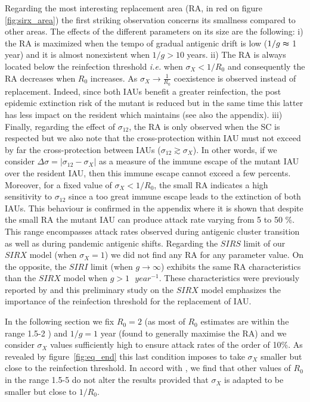 Regarding the most interesting replacement area (RA, in red on figure
\ref{fig:sirx_area}) the first striking observation concerns its
smallness compared to other areas. The effects of the different
parameters on its size are the following: i) the RA is maximized when
the tempo of gradual antigenic drift is low ($1/g\thickapprox$ 1 year)
and it is almost nonexistent when $1/g>10$ years. ii) The RA is always
located below the reinfection threshold \textit{i.e.} when
$\sigma_{X}<1/R_{0}$ and consequently the RA decreases when $R_{0}$
increases. As $\sigma_{X} \to \frac{1}{R_0}$ coexistence is observed
instead of replacement. Indeed, since both IAUs benefit a greater
reinfection, the post epidemic extinction risk of the mutant is
reduced but in the same time this latter has less impact on the
resident which maintains (see also the appendix). iii) Finally, regarding the
effect of $\sigma_{12}$, the RA is only observed when the SC is
respected but we also note that the cross-protection within IAU must
not exceed by far the cross-protection between IAUs
($\sigma_{12}\gtrsim\sigma_{X}$). In other words, if we consider
$\Delta\sigma=|\sigma_{12}-\sigma_{X}|$ as a measure of the immune
escape of the mutant IAU over the resident IAU, then this immune
escape cannot exceed a few percents. Moreover, for a fixed value of
$\sigma_{X}<1/R_{0}$, the small RA indicates a high sensitivity to
$\sigma_{12}$ since a too great immune escape leads to the extinction
of both IAUs. This behaviour is confirmed in the appendix where it is
shown that despite the small RA the mutant IAU can produce attack rate
varying from 5 to 50 \%. This range encompasses attack rates observed
during antigenic cluster transition as well as during pandemic
antigenic shifts. Regarding the $SIRS$ limit of our $SIRX$ model (when
$\sigma_{X}=1$) we did not find any RA for any parameter value. On the
opposite, the $SIRI$ limit (when $g\to\infty$) exhibits the same RA
characteristics than the $SIRX$ model when $g>1\text{ }year^{-1}$.
These characteristics were previously reported by
\citet{Goekaydin2007} and this preliminary study on the $SIRX$ model
emphasizes the importance of the reinfection threshold for the
replacement of IAU.

In the following section we fix $R_0=2$ (as most of $R_0$ estimates
are within the range 1.5-2 \citep{Lessler2007}) and $1/g=1$ year
(found to generally maximise the RA) and we consider $\sigma_{X}$
values sufficiently high to ensure attack rates of the order of 10\%.
As revealed by figure~\ref{fig:eq_end} this last condition imposes to
take $\sigma_{X}$ smaller but close to the reinfection threshold. In
accord with \citet{Goekaydin2007}, we find that other values of $R_0$
in the range 1.5-5 do not alter the results provided that $\sigma_{X}$
is adapted to be smaller but close to $1/R_0$.


